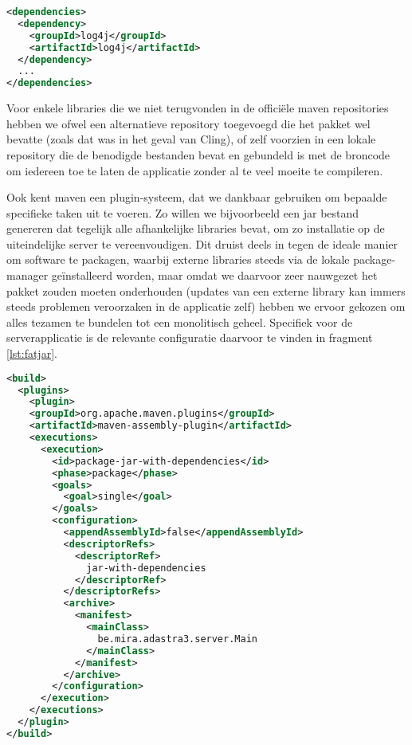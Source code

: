 \begin{lstlisting}[language=XML, float, caption=Inladen van externe libraries via Maven., label=lst:maven]
<dependencies>
  <dependency>
    <groupId>log4j</groupId>
    <artifactId>log4j</artifactId>
  </dependency>
  ...
</dependencies>
\end{lstlisting}

Voor enkele libraries die we niet terugvonden in de officiële \ac{maven} repositories hebben we ofwel een alternatieve repository toegevoegd die het pakket wel bevatte (zoals dat was in het geval van Cling), of zelf voorzien in een lokale repository die de benodigde bestanden bevat en gebundeld is met de broncode om iedereen toe te laten de applicatie zonder al te veel moeite te compileren.

Ook kent \ac{maven} een plugin-systeem, dat we dankbaar gebruiken om bepaalde specifieke taken uit te voeren. Zo willen we bijvoorbeeld een \ac{jar} bestand genereren dat tegelijk alle afhankelijke libraries bevat, om zo installatie op de uiteindelijke server te vereenvoudigen. Dit druist deels in tegen de ideale manier om software te packagen, waarbij externe libraries steeds via de lokale package-manager geïnstalleerd worden, maar omdat we daarvoor zeer nauwgezet het pakket zouden moeten onderhouden (updates van een externe library kan immers steeds problemen veroorzaken in de applicatie zelf) hebben we ervoor gekozen om alles tezamen te bundelen tot een monolitisch geheel. Specifiek voor de serverapplicatie is de relevante configuratie daarvoor te vinden in fragment \ref{lst:fatjar}.

\begin{lstlisting}[language=XML, float, caption=Gebruik van Maven modules om een executable te compileren., label=lst:fatjar]
<build>
  <plugins>
    <plugin>
    <groupId>org.apache.maven.plugins</groupId>
    <artifactId>maven-assembly-plugin</artifactId>
    <executions>
      <execution>
        <id>package-jar-with-dependencies</id>
        <phase>package</phase>
        <goals>
          <goal>single</goal>
        </goals>
        <configuration>
          <appendAssemblyId>false</appendAssemblyId>
          <descriptorRefs>
            <descriptorRef>
              jar-with-dependencies
            </descriptorRef>
          </descriptorRefs>
          <archive>
            <manifest>
              <mainClass>
                be.mira.adastra3.server.Main
              </mainClass>
            </manifest>
          </archive>
        </configuration>
      </execution>
    </executions>
  </plugin>
</build>
\end{lstlisting}

